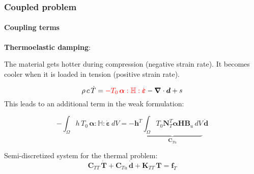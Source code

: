\documentclass[10pt,xcolor=pdftex,dvipsnames,table]{beamer}
\begin{document}
\begin{frame}
	\frametitle{ Coupled problem }
	\framesubtitle{ Coupling terms  }
	
	\textbf{Thermoelastic damping}:
	
	
	The material gets hotter during compression (negative strain rate). It becomes cooler when it is loaded in tension (positive strain rate).
	
	\begin{equation*}
		  \rho\,c\,\dot{T} = {\color{red} - T_0\,\boldsymbol{\alpha}:\mathbb{H}:\dot{\boldsymbol{\varepsilon}} } - \boldsymbol{\nabla}\cdot\boldsymbol{d} + s
	\end{equation*}	
	This leads to an additional term in the weak formulation: 
	
	\begin{equation*}
		- \int_{\Omega} h\,T_0\,\boldsymbol{\alpha}:\mathbb{H}:\dot{\boldsymbol{\varepsilon}}\,dV 
		= - \boldsymbol{h}^T  \underbrace{\int_{\Omega} T_0 \mathbf{N}_T^T\boldsymbol{\alpha}\mathbf{H}\mathbf{B}_u\,dV}_{\mathbf{C}_{Tu}}
		\,\dot{\boldsymbol{d}}
	\end{equation*}

	Semi-discretized system for the thermal problem:
	\begin{equation*}
		\mathbf{C}_{TT}\, \dot{\boldsymbol{T}} + \mathbf{C}_{Tu}\, \dot{\boldsymbol{d}} + \mathbf{K}_{TT}\, \boldsymbol{T} = \boldsymbol{f}_T
	\end{equation*}	
	
\end{frame}
\end{document}
